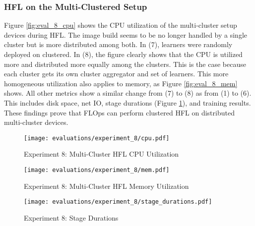 \subsubsection{HFL on the Multi-Clustered Setup}

Figure \ref{fig:eval_8_cpu} shows the CPU utilization of the multi-cluster setup devices during HFL.
The image build seems to be no longer handled by a single cluster but is more distributed among both.
In (7), learners were randomly deployed on clustered.
In (8), the figure clearly shows that the CPU is utilized more and distributed more equally among the clusters.
This is the case because each cluster gets its own cluster aggregator and set of learners.
This more homogeneous utilization also applies to memory, as Figure \ref{fig:eval_8_mem} shows.
All other metrics show a similar change from (7) to (8) as from (1) to (6).
This includes disk space, net IO, stage durations (Figure \ref{fig:eval_8_stage_durations}), and training results.
These findings prove that FLOps can perform clustered HFL on distributed multi-cluster devices.


\begin{figure}[p]
    \begin{adjustwidth}{-0.2\paperwidth}{-0.2\paperwidth}
        \centering
        \texttt{[image: evaluations/experiment\_8/cpu.pdf]}
        \caption{Experiment 8: Multi-Cluster HFL CPU Utilization}
        \label{fig:eval_8_cpu}
    \end{adjustwidth}

    \begin{adjustwidth}{-0.2\paperwidth}{-0.2\paperwidth}
        \centering
        \texttt{[image: evaluations/experiment\_8/mem.pdf]}
        \caption{Experiment 8: Multi-Cluster HFL Memory Utilization}
        \label{fig:eval_8_mem}
    \end{adjustwidth}

    \begin{adjustwidth}{-0.2\paperwidth}{-0.2\paperwidth}
        \centering
        \texttt{[image: evaluations/experiment\_8/stage\_durations.pdf]}
        \caption{Experiment 8: Stage Durations}
        \label{fig:eval_8_stage_durations}
    \end{adjustwidth}
\end{figure}